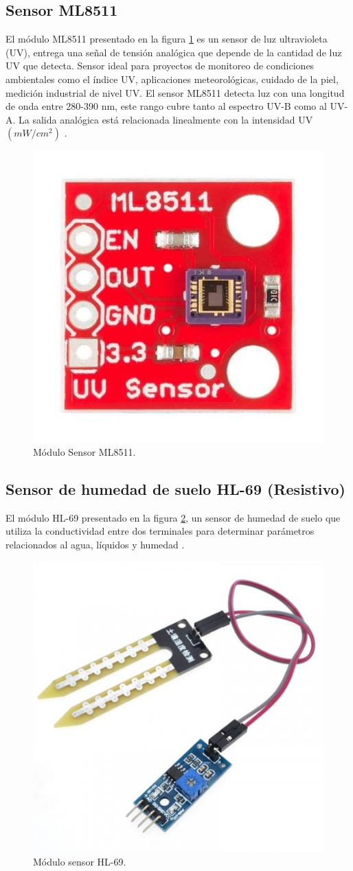 \subsection{Sensor ML8511}
El módulo ML8511 presentado en la figura \ref{fig:SensorML8511} es un sensor de luz ultravioleta (UV), entrega una señal de tensión analógica que depende de la cantidad de luz UV que detecta. Sensor ideal para proyectos de monitoreo de condiciones ambientales como el índice UV, aplicaciones meteorológicas, cuidado de la piel, medición industrial de nivel UV.
El sensor ML8511 detecta luz con una longitud de onda entre 280-390 nm, este rango cubre tanto al espectro UV-B como al UV-A. La salida analógica está relacionada linealmente con la intensidad UV $(mW/cm^2)$ \citep{ModuloML8511}.
\begin{figure}[htbp]
	\centering
	\includegraphics[width=.3\textwidth]{./Figures/ml8511.jpg}
	\caption{Módulo Sensor ML8511.}
	\label{fig:SensorML8511}
\end{figure}
\subsection{Sensor de humedad de suelo HL-69 (Resistivo)}
El módulo HL-69 presentado en la figura \ref{fig:SensorHL-69}, un sensor de humedad de suelo que utiliza la conductividad entre dos terminales para determinar parámetros relacionados al agua, líquidos y humedad \citep{ModuloHL-69}.
\begin{figure}[htbp]
	\centering
	\includegraphics[width=.4\textwidth]{./Figures/sensordehumedad.jpg}
	\caption{Módulo sensor HL-69.}
	\label{fig:SensorHL-69}
\end{figure}

